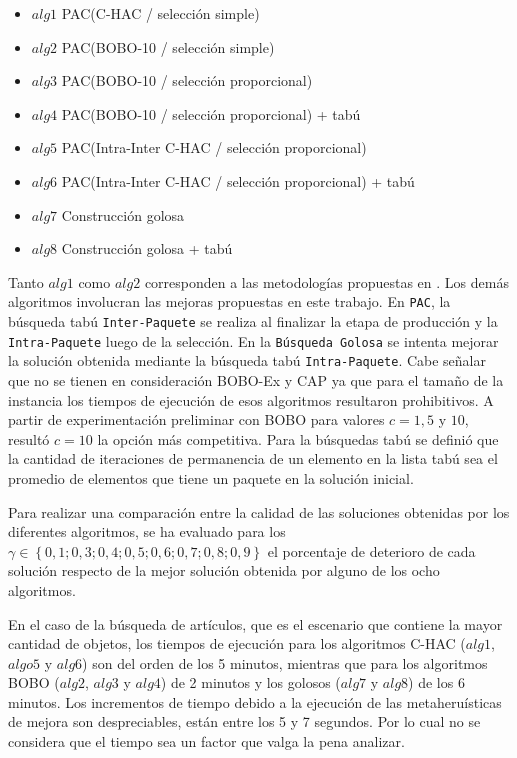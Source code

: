 \begin{itemize}
\item{$alg1$} PAC(C-HAC / selección simple)
\item{$alg2$} PAC(BOBO-10 / selección simple)
\item{$alg3$} PAC(BOBO-10 / selección proporcional)
\item{$alg4$} PAC(BOBO-10 / selección proporcional) + tabú
\item{$alg5$} PAC(Intra-Inter C-HAC / selección proporcional)
\item{$alg6$} PAC(Intra-Inter C-HAC / selección proporcional) + tabú
\item{$alg7$} Construcción golosa
\item{$alg8$} Construcción golosa + tabú
\end{itemize}

Tanto $alg1$ como $alg2$ corresponden a las metodologías propuestas en \cite{journals/tkde/Amer-YahiaBCFMZ14}. Los demás algoritmos involucran las mejoras propuestas en este trabajo. En \texttt{PAC}, la búsqueda tabú \texttt{Inter-Paquete} se realiza al finalizar la etapa de producción y la \texttt{Intra-Paquete} luego de la selección. En la \texttt{Búsqueda Golosa} se intenta mejorar la solución obtenida mediante la búsqueda tabú \texttt{Intra-Paquete}. Cabe señalar que no se tienen en consideración BOBO-Ex y CAP ya que para el tamaño de la instancia los tiempos de ejecución de esos algoritmos resultaron prohibitivos. A partir de experimentación preliminar con BOBO para valores $c=1, 5$ y $10$, resultó $c=10$ la opción más competitiva. Para la búsquedas tabú se definió que la cantidad de iteraciones de permanencia de un elemento en la lista tabú sea el promedio de elementos que tiene un paquete en la solución inicial.

Para realizar una comparación entre la calidad de las soluciones obtenidas por los diferentes algoritmos, se ha evaluado para los $\gamma \in \left\{0,1; 0,3; 0,4; 0,5; 0,6; 0,7; 0,8; 0,9\right\}$ el porcentaje de deterioro de cada solución respecto de la mejor solución obtenida por alguno de los ocho algoritmos.

En el caso de la búsqueda de artículos, que es el escenario que contiene la mayor cantidad de objetos, los tiempos de ejecución  para los algoritmos C-HAC ($alg1$, $algo5$ y $alg6$) son del orden de los 5 minutos, mientras que para los algoritmos BOBO ($alg2$, $alg3$ y $alg4$) de 2 minutos y los golosos ($alg7$ y $alg8$) de los 6 minutos. Los incrementos de tiempo debido a la ejecución de las metaheruísticas de mejora son despreciables, están entre los 5 y 7 segundos. Por lo cual no se considera que el tiempo sea un factor que valga la pena analizar.

